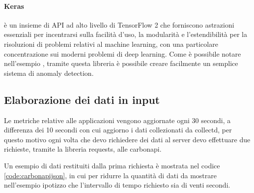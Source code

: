 \paragraph{Keras} è un insieme di API ad alto livello di TensorFlow 2 che forniscono astrazioni essenziali per incentrarsi sulla facilità d'uso, la modularità e l'estendibilità per la risoluzioni di problemi relativi al machine learning, con una particolare concentrazione sui moderni problemi di deep learning.
Come è possibile notare nell'esempio \cite{keras_esempio}, tramite questa libreria è possibile creare facilmente un semplice sistema di anomaly detection.


\subsection{Elaborazione dei dati in input}


Le metriche relative alle applicazioni vengono aggiornate ogni 30 secondi, a differenza dei 10 secondi con cui aggiorno i dati collezionati da collectd, per questo motivo ogni volta che devo richiedere dei dati al server devo effettuare due richieste, tramite la libreria requests, alle carbonapi.


Un esempio di dati restituiti dalla prima richiesta è mostrata nel codice \ref{code:carbonapijson}, in cui per ridurre la quantità di dati da mostrare nell'esempio ipotizzo che l'intervallo di tempo richiesto sia di venti secondi.

